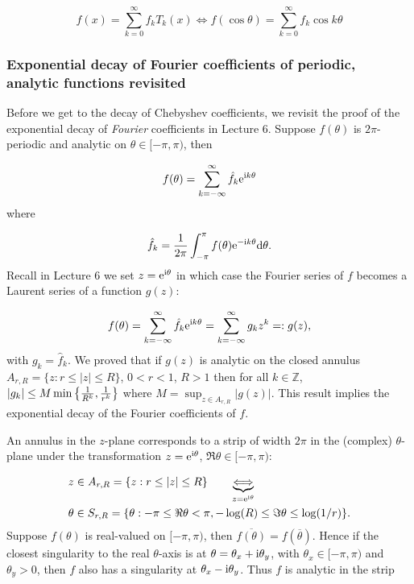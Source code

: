 \documentclass[12pt,a4paper]{article}
\begin{document}
\[
f(x) = \sum_{k=0}^\infty f_k T_k(x) \Leftrightarrow f(\cos \theta) = \sum_{k=0}^\infty f_k \cos k \theta
\]
\subsubsection{Exponential decay of Fourier coefficients of periodic, analytic functions revisited}
Before we get to the decay of Chebyshev coefficients, we revisit the proof of the exponential decay of \emph{Fourier} coefficients in Lecture 6. Suppose $f(\theta)$ is $2\pi$-periodic and analytic on $\theta \in [-\pi, \pi)$, then

\[
    f(\theta) = \sum_{k=-\infty}^\infty \hat f_k {\rm e}^{{\rm i} k \theta}
\]
where

\[
\hat f_k = {1\over 2 \pi} \int_{-\pi}^\pi f(\theta){\rm e}^{-{\rm i} k \theta} {\rm d} \theta.
\]
Recall in Lecture 6 we set $z = {\rm e}^{{\rm i} \theta}$ in which case the Fourier series of $f$ becomes a Laurent series of a function $g(z)$:

\[
f(\theta) = \sum_{k=-\infty}^\infty \hat f_k {\rm e}^{{\rm i} k \theta} = \sum_{k=-\infty}^\infty g_k z^k =: g(z),
\]
with $g_k = \hat f_k$. We proved that if $g(z)$ is analytic on the closed annulus $A_{r,R} = \lbrace z : r \leq \vert z \vert \leq R \rbrace$, $0 < r <1$, $R > 1$ then for all $k \in \mathbb{Z}$, $|g_k | \leq M\min\left\{{1 \over R^k} , {1 \over r^k}\right\}$ where $M = \sup_{z \in  A_{r,R}} |g(z)|$. This result implies the exponential decay of the Fourier coefficients of $f$.

An annulus in the $z$-plane corresponds to a strip of width $2\pi$ in the (complex) $\theta$-plane under the transformation $z = {\rm e}^{{\rm i} \theta}$, $\Re \theta \in [-\pi, \pi)$:


\begin{align*}
& z \in A_{r,R} = \lbrace z : r \leq \vert z \vert \leq R \rbrace \qquad \underbrace{\Longleftrightarrow}_{z = {\rm e}^{{\rm i} \theta}} \\
& \theta \in  S_{r,R} =   \lbrace \theta : -\pi \leq \Re  \theta < \pi,  -\log(R) \leq \Im \theta \leq \log(1/r) \rbrace.
\end{align*}
Suppose $f(\theta)$ is real-valued on $[-\pi, \pi)$, then $\overline{f(\theta)} = f(\overline{\theta})$. Hence if the closest singularity to the real $\theta$-axis is at $\theta = \theta_x + {\rm i} \theta_y$, with $\theta_x \in [-\pi, \pi)$ and $\theta_y > 0$, then $f$ also has a singularity at  $\theta_x - {\rm i} \theta_y$. Thus $f$ is analytic in the strip
\end{document}

